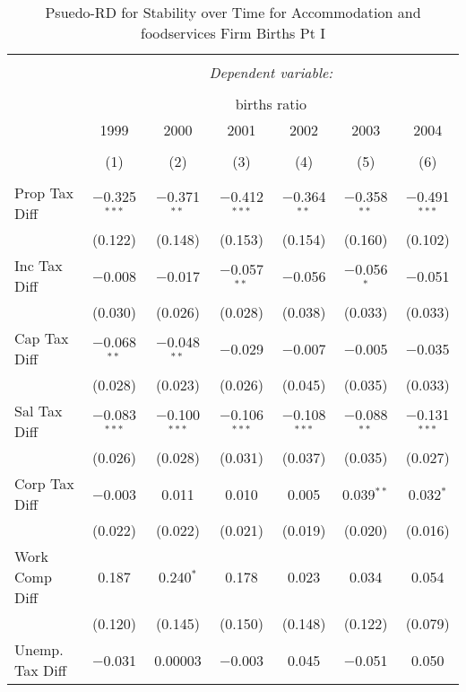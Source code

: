 
\begin{table}[!htbp] \centering 
  \caption{Psuedo-RD for Stability over Time for  Accommodation and foodservices Firm Births Pt I} 
  \label{72year} 
\small 
\begin{tabular}{@{\extracolsep{5pt}}lcccccc} 
\\[-1.8ex]\hline 
\hline \\[-1.8ex] 
 & \multicolumn{6}{c}{\textit{Dependent variable:}} \\ 
\cline{2-7} 
\\[-1.8ex] & \multicolumn{6}{c}{births ratio} \\ 
 & 1999 & 2000 & 2001 & 2002 & 2003 & 2004 \\ 
\\[-1.8ex] & (1) & (2) & (3) & (4) & (5) & (6)\\ 
\hline \\[-1.8ex] 
 Prop Tax Diff & $-$0.325$^{***}$ & $-$0.371$^{**}$ & $-$0.412$^{***}$ & $-$0.364$^{**}$ & $-$0.358$^{**}$ & $-$0.491$^{***}$ \\ 
  & (0.122) & (0.148) & (0.153) & (0.154) & (0.160) & (0.102) \\ 
  Inc Tax Diff & $-$0.008 & $-$0.017 & $-$0.057$^{**}$ & $-$0.056 & $-$0.056$^{*}$ & $-$0.051 \\ 
  & (0.030) & (0.026) & (0.028) & (0.038) & (0.033) & (0.033) \\ 
  Cap Tax Diff & $-$0.068$^{**}$ & $-$0.048$^{**}$ & $-$0.029 & $-$0.007 & $-$0.005 & $-$0.035 \\ 
  & (0.028) & (0.023) & (0.026) & (0.045) & (0.035) & (0.033) \\ 
  Sal Tax Diff & $-$0.083$^{***}$ & $-$0.100$^{***}$ & $-$0.106$^{***}$ & $-$0.108$^{***}$ & $-$0.088$^{**}$ & $-$0.131$^{***}$ \\ 
  & (0.026) & (0.028) & (0.031) & (0.037) & (0.035) & (0.027) \\ 
  Corp Tax Diff & $-$0.003 & 0.011 & 0.010 & 0.005 & 0.039$^{**}$ & 0.032$^{*}$ \\ 
  & (0.022) & (0.022) & (0.021) & (0.019) & (0.020) & (0.016) \\ 
  Work Comp Diff & 0.187 & 0.240$^{*}$ & 0.178 & 0.023 & 0.034 & 0.054 \\ 
  & (0.120) & (0.145) & (0.150) & (0.148) & (0.122) & (0.079) \\ 
  Unemp. Tax Diff & $-$0.031 & 0.00003 & $-$0.003 & 0.045 & $-$0.051 & 0.050 \\ 

\end{tabular}
\end{table}
